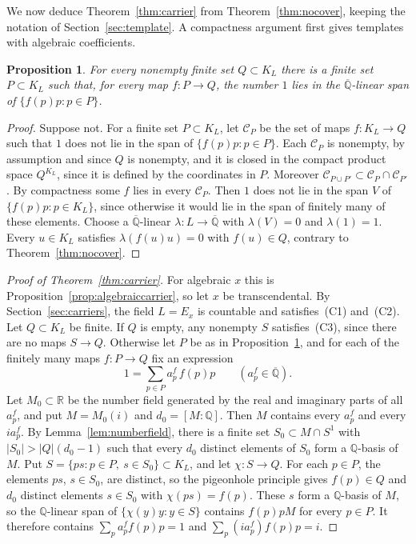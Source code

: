 \documentclass[10pt]{article}
\newtheorem{prop}[thm]{Proposition}
\theoremstyle{remark}
\newcommand{\R}{\mathbb R}
\newcommand{\Q}{\mathbb Q}
\newcommand{\Qbar}{\overline{\mathbb Q}}
\begin{document}
We now deduce Theorem~\ref{thm:carrier} from Theorem~\ref{thm:nocover}, keeping the notation of Section~\ref{sec:template}. A compactness argument first gives templates with algebraic coefficients.

\begin{prop}\label{prop:algebraictemplate}
For every nonempty finite set $Q\subset K_L$ there is a finite set $P\subset K_L$ such that, for every map $f\colon P\to Q$, the number $1$ lies in the $\Qbar$-linear span of $\{f(p)p:p\in P\}$.
\end{prop}

\begin{proof}
Suppose not. For a finite set $P\subset K_L$, let $\mathcal C_P$ be the set of maps $f\colon K_L\to Q$ such that $1$ does not lie in the span of $\{f(p)p:p\in P\}$. Each $\mathcal C_P$ is nonempty, by assumption and since $Q$ is nonempty, and it is closed in the compact product space $Q^{K_L}$, since it is defined by the coordinates in $P$. Moreover $\mathcal C_{P\cup P'}\subset\mathcal C_P\cap\mathcal C_{P'}$. By compactness some $f$ lies in every $\mathcal C_P$. Then $1$ does not lie in the span $V$ of $\{f(p)p:p\in K_L\}$, since otherwise it would lie in the span of finitely many of these elements. Choose a $\Qbar$-linear $\lambda\colon L\to\Qbar$ with $\lambda(V)=0$ and $\lambda(1)=1$. Every $u\in K_L$ satisfies $\lambda(f(u)u)=0$ with $f(u)\in Q$, contrary to Theorem~\ref{thm:nocover}.
\end{proof}

\begin{proof}[Proof of Theorem~\ref{thm:carrier}]
For algebraic $x$ this is Proposition~\ref{prop:algebraiccarrier}, so let $x$ be transcendental. By Section~\ref{sec:carriers}, the field $L=E_x$ is countable and satisfies~(C1) and~(C2). Let $Q\subset K_L$ be finite. If $Q$ is empty, any nonempty $S$ satisfies~(C3), since there are no maps $S\to Q$. Otherwise let $P$ be as in Proposition~\ref{prop:algebraictemplate}, and for each of the finitely many maps $f\colon P\to Q$ fix an expression
\[
 1=\sum_{p\in P}a^f_p\,f(p)p\qquad(a^f_p\in\Qbar).
\]
Let $M_0\subset\R$ be the number field generated by the real and imaginary parts of all $a^f_p$, and put $M=M_0(i)$ and $d_0=[M:\Q]$. Then $M$ contains every $a^f_p$ and every $ia^f_p$. By Lemma~\ref{lem:numberfield}, there is a finite set $S_0\subset M\cap S^1$ with $|S_0|>|Q|(d_0-1)$ such that every $d_0$ distinct elements of $S_0$ form a $\Q$-basis of $M$. Put $S=\{ps:p\in P,\ s\in S_0\}\subset K_L$, and let $\chi\colon S\to Q$. For each $p\in P$, the elements $ps$, $s\in S_0$, are distinct, so the pigeonhole principle gives $f(p)\in Q$ and $d_0$ distinct elements $s\in S_0$ with $\chi(ps)=f(p)$. These $s$ form a $\Q$-basis of $M$, so the $\Q$-linear span of $\{\chi(y)y:y\in S\}$ contains $f(p)pM$ for every $p\in P$. It therefore contains $\sum_pa^f_pf(p)p=1$ and $\sum_p(ia^f_p)f(p)p=i$.
\end{proof}
\end{document}
